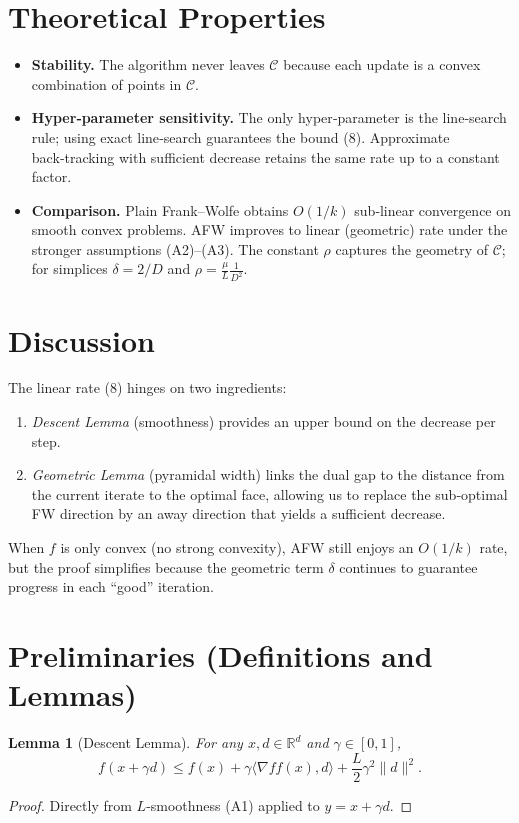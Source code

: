 \documentclass[11pt]{article}
\newtheorem{lemma}{Lemma}
\newcommand{\R}{\mathbb{R}}
\newcommand{\C}{\mathcal{C}}
\newcommand{\width}{\delta}
\newcommand{\grad}{\nabla f}
\begin{document}
\section*{Theoretical Properties}
\begin{itemize}
\item \textbf{Stability.} The algorithm never leaves $\C$ because each update is a convex combination of points in $\C$.
\item \textbf{Hyper‑parameter sensitivity.}
The only hyper‑parameter is the line‑search rule; using exact line‑search guarantees the bound (8). Approximate back‑tracking with sufficient decrease retains the same rate up to a constant factor.
\item \textbf{Comparison.}
Plain Frank–Wolfe obtains $O(1/k)$ sub‑linear convergence on smooth convex problems. AFW improves to linear (geometric) rate under the stronger assumptions (A2)–(A3). The constant $\rho$ captures the geometry of $\C$; for simplices $\width=2/D$ and $\rho=\frac{\mu}{L}\frac{1}{D^{2}}$.
\end{itemize}

\section*{Discussion}
The linear rate (8) hinges on two ingredients:
\begin{enumerate}
\item \emph{Descent Lemma} (smoothness) provides an upper bound on the decrease per step.
\item \emph{Geometric Lemma} (pyramidal width) links the dual gap to the distance from the current iterate to the optimal face, allowing us to replace the sub‑optimal FW direction by an away direction that yields a sufficient decrease.
\end{enumerate}
When $f$ is only convex (no strong convexity), AFW still enjoys an $O(1/k)$ rate, but the proof simplifies because the geometric term $\width$ continues to guarantee progress in each ``good'' iteration.

\section*{Preliminaries (Definitions and Lemmas)}
\begin{lemma}[Descent Lemma]\label{lem:descent}
For any $x,d\in\R^{d}$ and $\gamma\in[0,1]$,
\[
f(x+\gamma d)\le f(x)+\gamma\langle \grad f(x),d\rangle
+\frac{L}{2}\gamma^{2}\|d\|^{2}.
\tag{9}
\]
\end{lemma}
\begin{proof}
Directly from $L$‑smoothness (A1) applied to $y=x+\gamma d$.
\end{proof}
\end{document}

